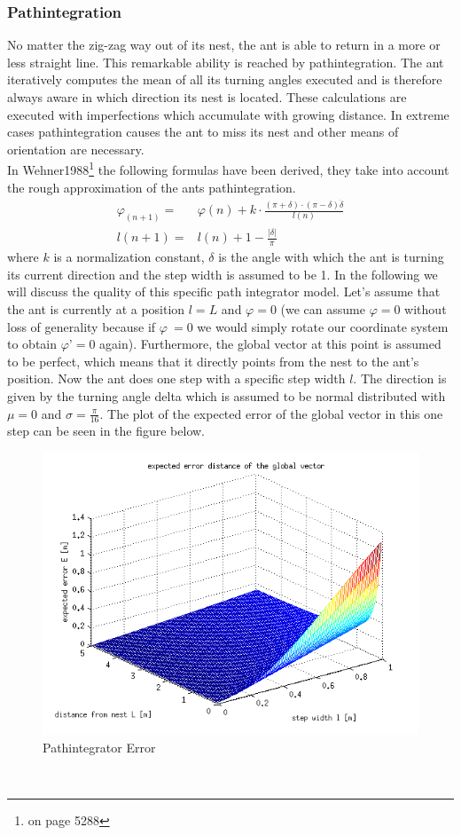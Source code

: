 \documentclass[11pt]{article}
\begin{document}
\subsubsection{Pathintegration}\label{Sec:PathIntegration}
No matter the zig-zag way out of its nest, the ant is able to return in a more or less straight line. This remarkable ability is reached by pathintegration. The ant iteratively computes the mean of all its turning angles executed and is therefore always aware in which direction its nest is located. These calculations are executed with imperfections which accumulate with growing distance. In extreme cases pathintegration causes the ant to miss its nest and other means of orientation are necessary. \\
In Wehner1988\cite{Wehner1988}\footnote{on page 5288} the following formulas have been derived, they take into account the rough approximation of the ants pathintegration. 
\begin{align*}
\varphi_(n+1) =& \varphi(n) +k \cdot \frac{(\pi +\delta)\cdot(\pi-\delta)\dot \delta}{l(n)}\\
l(n+1) =& l(n) +1 -\frac{|\delta|}{\pi}
\end{align*}
where $k$ is a normalization constant, $\delta$ is the angle with which the ant is turning its current direction and the step width is assumed to be 1.
In the following we will discuss the quality of this specific path integrator model.
Let’s assume that the ant is currently at a position $l = L$ and $\varphi = 0$ (we can assume $\varphi = 0$ without loss of generality because if $\varphi ~= 0$ we would simply rotate our coordinate system to obtain $\varphi’ = 0$ again). Furthermore, the global vector at this point is assumed to be perfect, which means that it directly points from the nest to the ant’s position. 
Now the ant does one step with a specific step width $l$. The direction is given by the turning angle delta which is assumed to be normal distributed with $\mu = 0$ and $\sigma = \frac{\pi}{16}$.  
The plot of the expected error of the global vector in this one step can be seen in the figure below.
\begin{figure}[h]
\centering
\includegraphics[scale=0.7]{./Pics/pathintegrator_error_plot.png} 
\caption[Pathintegrator Error]{Pathintegrator Error}
\end{figure} \\
\end{document}
